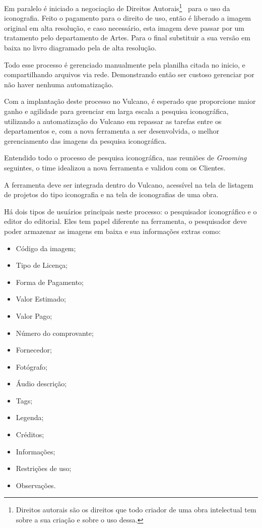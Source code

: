 \documentclass[
  12pt,				%
  openany,
  oneside,
  a4paper,			%
  english,			%
  brazil
]{article}
\numberwithin{figure}{section}
\numberwithin{table}{section}
\newcounter{subsubsubsection}[subsubsection]
\begin{document}
Em paralelo é iniciado a negociação de Direitos Autorais\footnote{Direitos autorais são os direitos que todo criador de uma obra intelectual tem sobre a sua criação e sobre o uso dessa.}~\cite{SEBRAE_DA} para o uso da iconografia. Feito o pagamento para o direito de uso, então é liberado a imagem original em alta resolução, e caso necessário, esta imagem deve passar por um tratamento pelo departamento de Artes. Para o final substituir a sua versão em baixa no livro diagramado pela de alta resolução.


Todo esse processo é gerenciado manualmente pela planilha citada no inicio, e compartilhando arquivos via rede. Demonstrando então ser custoso gerenciar por não haver nenhuma automatização. 

Com a implantação deste processo no Vulcano, é esperado que proporcione maior ganho e agilidade para gerenciar em larga escala a pesquisa iconográfica, utilizando a automatização do Vulcano em repassar as tarefas entre os departamentos e, com a nova ferramenta a ser desenvolvida, o melhor gerenciamento das imagens da pesquisa iconográfica.



Entendido todo o processo de pesquisa iconográfica, nas reuniões de \textit{Grooming} seguintes, o time idealizou a nova ferramenta e validou com os Clientes.

A ferramenta deve ser integrada dentro do Vulcano, acessível na tela de listagem de projetos do tipo iconografia e na tela de iconografias de uma obra.

Há dois tipos de usuários principais neste processo: o pesquisador iconográfico e o editor do editorial. Eles tem papel diferente na ferramenta, o pesquisador deve poder armazenar as imagens em baixa e sua informações extras como:

\vspace{-10mm}
\begin{singlespace}
	\begin{itemize}
		\item Código da imagem;
		\item Tipo de Licença;
		\item Forma de Pagamento;
		\item Valor Estimado;
		\item Valor Pago;
		\item Número do comprovante;
		\item Fornecedor;
		\item Fotógrafo;
		\item Áudio descrição;
		\item Tags;
		\item Legenda;
		\item Créditos;
		\item Informações;
		\item Restrições de uso;
		\item Observações.
	\end{itemize}
\end{singlespace}
\vspace{-5mm}
\end{document}
